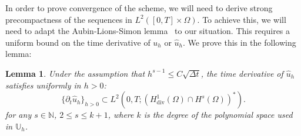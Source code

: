 \documentclass[10pt,letterpaper]{amsart}
\newcommand{\N}{\mathbb{N}}
\newcommand{\hu}{\widehat{u}}
\newcommand{\Div}{\operatorname{div}}
\newcommand{\dom}{\Omega}
\newcommand{\Uh}{\mathbb{U}_h}
\newtheorem{lemma}{Lemma}[section]
\theoremstyle{definition}{\newtheorem{definition}[lemma]{Definition}}
\numberwithin{equation}{section}
\begin{document}
In order to prove convergence of the scheme, we will need to derive strong precompactness of the sequences in $L^2([0,T]\times\dom)$. To achieve this, we will need to adapt the Aubin-Lions-Simon lemma~\cite{Temam1977,Simon1987} to our situation. This requires a uniform bound  on the time derivative of $u_h$ or $\hu_h$. We prove this in the following lemma:
\begin{lemma}
	\label{lem:timederivativebounds}
	Under the assumption that $h^{s-1}\leq C \sqrt{\Delta t}$, the time derivative  of   $\hu_h$ satisfies uniformly in $h>0$:
	\begin{equation}
		\label{eq:timederu}
		 \{\partial_t \hu_h\}_{h>0}\subset L^2(0,T;(H_{\Div}^1(\dom)\cap H^s(\dom))^*).
	\end{equation}
	for any $s\in \N$, $2\leq s\leq k+1$, where $k$ is the degree of the polynomial space used in $\Uh$.
\end{lemma}
\end{document}

